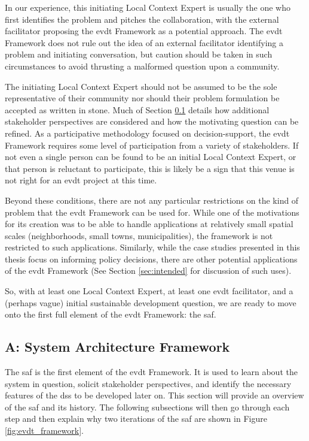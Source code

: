 In our experience, this initiating Local Context Expert is usually the one who first identifies the problem and pitches the collaboration, with the external facilitator proposing the \ac{evdt} Framework as a potential approach. The \ac{evdt} Framework does not rule out the idea of an external facilitator identifying a problem and initiating conversation, but caution should be taken in such circumstances to avoid thrusting a malformed question upon a community.

The initiating Local Context Expert should not be assumed to be the sole representative of their community nor should their problem formulation be accepted as written in stone. Much of Section \ref{sec:saf} details how additional stakeholder perspectives are considered and how the motivating question can be refined. As a participative methodology focused on decision-support, the \ac{evdt} Framework requires some level of participation from a variety of stakeholders. If not even a single person can be found to be an initial Local Context Expert, or that person is reluctant to participate, this is likely be a sign that this venue is not right for an \ac{evdt} project at this time.

Beyond these conditions, there are not any particular restrictions on the kind of problem that the \ac{evdt} Framework can be used for. While one of the motivations for its creation was to be able to handle applications at relatively small spatial scales (neighborhoods, small towns, municipalities), the framework is not restricted to such applications. Similarly, while the case studies presented in this thesis focus on informing policy decisions, there are other potential applications of the \ac{evdt} Framework (See Section \ref{sec:intended} for discussion of such uses). 

So, with at least one Local Context Expert, at least one \ac{evdt} facilitator, and a (perhaps vague) initial sustainable development question, we are ready to move onto the first full element of the \ac{evdt} Framework: the \ac{saf}.


\subsection{A: System Architecture Framework} \label{sec:saf}

The \acf{saf} is the first element of the \ac{evdt} Framework. It is used to learn about the system in question, solicit stakeholder perspectives, and identify the necessary features of the \ac{dss} to be developed later on. This section will provide an overview of the \ac{saf} and its history. The following subsections will then go through each step and then explain why two iterations of the \ac{saf} are shown in Figure \ref{fig:evdt_framework}.

